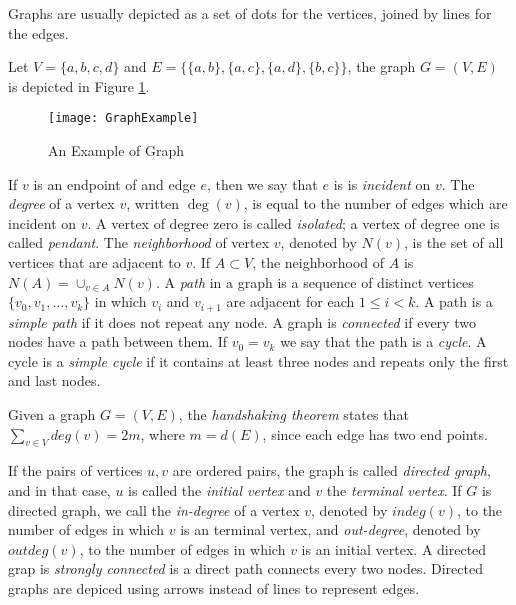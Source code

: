 Graphs are usually depicted as a set of dots for the vertices, joined by lines for the edges.

\begin{example}
\label{ex:binary_tree}
Let $V=\{a, b, c, d\}$ and $E=\{ \{a,b\}, \{a,c\}, \{a,d\}, \{b,c\} \}$, the graph $G=(V,E)$ is depicted in Figure \ref{fig:Graph-Example}.
\end{example}

\begin{figure}[h]
\centering\texttt{[image: GraphExample]}
\caption{\label{fig:Graph-Example}An Example of Graph}
\end{figure}

If $v$ is an endpoint of and edge $e$, then we say that $e$ is is \emph{incident} on $v$. The \emph{degree} of a vertex $v$, written $\deg(v)$, is equal to the number of edges which are incident on $v$. A vertex of degree zero is called \emph{isolated}; a vertex of degree one is called \emph{pendant}. The \emph{neighborhood} of vertex $v$, denoted by $N(v)$, is the set of all vertices that are adjacent to $v$. If $A \subset V$, the neighborhood of $A$ is $N(A) = \cup_{v \in A} N(v)$. A \emph{path} in a graph is a sequence of distinct vertices $\{v_{0}, v_{1}, \ldots ,v_{k}\}$ in which $v_{i}$ and $v_{i+1}$ are adjacent for each $1 \leq i < k$. A path is a \emph{simple path} if it does not repeat any node. A graph is \emph{connected} if every two nodes have a path between them. If $v_{0} = v_{k}$ we say that the path is a \emph{cycle}. A cycle is a \emph{simple cycle} if it contains at least three nodes and repeats only the first and last nodes. 

\begin{example}
Given a graph $G=(V,E)$, the \emph{handshaking theorem} states that $\sum_{v \in V} deg(v) = 2 m$, where $m = d(E)$, since each edge has two end points.
\end{example}

If the pairs of vertices $u, v$ are ordered pairs, the graph is called \emph{directed graph}, and in that case, $u$ is called the \emph{initial vertex} and $v$ the \emph{terminal vertex}. If $G$ is directed graph, we call the \emph{in-degree} of a vertex $v$, denoted by $indeg(v)$, to the number of edges in which $v$ is an terminal vertex, and \emph{out-degree}, denoted by $outdeg(v)$, to the number of edges in which $v$ is an initial vertex. A directed grap is \emph{strongly connected} is a direct path connects every two nodes. Directed graphs are depiced using arrows instead of lines to represent edges.

